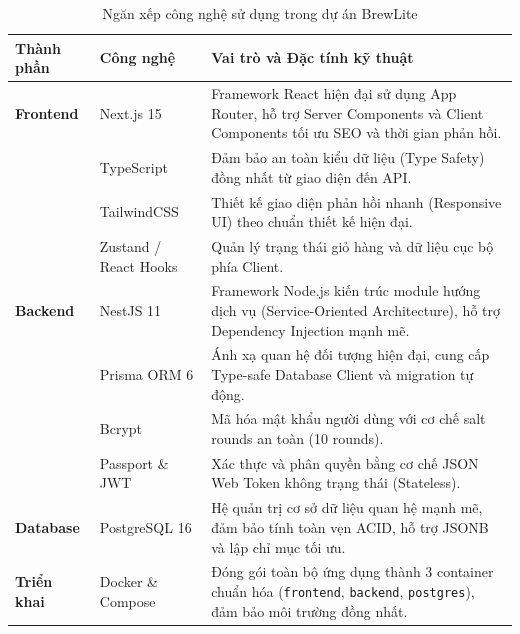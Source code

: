 \begin{table}[htbp]
\centering
\caption{Ngăn xếp công nghệ sử dụng trong dự án BrewLite}
\label{tab:tech-stack}
\begin{tabularx}{\textwidth}{llX}
\toprule
\textbf{Thành phần} & \textbf{Công nghệ} & \textbf{Vai trò và Đặc tính kỹ thuật} \\
\midrule
\textbf{Frontend} & Next.js 15 & Framework React hiện đại sử dụng App Router, hỗ trợ Server Components và Client Components tối ưu SEO và thời gian phản hồi. \\
& TypeScript & Đảm bảo an toàn kiểu dữ liệu (Type Safety) đồng nhất từ giao diện đến API. \\
& TailwindCSS & Thiết kế giao diện phản hồi nhanh (Responsive UI) theo chuẩn thiết kế hiện đại. \\
& Zustand / React Hooks & Quản lý trạng thái giỏ hàng và dữ liệu cục bộ phía Client. \\
\midrule
\textbf{Backend} & NestJS 11 & Framework Node.js kiến trúc module hướng dịch vụ (Service-Oriented Architecture), hỗ trợ Dependency Injection mạnh mẽ. \\
& Prisma ORM 6 & Ánh xạ quan hệ đối tượng hiện đại, cung cấp Type-safe Database Client và migration tự động. \\
& Bcrypt & Mã hóa mật khẩu người dùng với cơ chế salt rounds an toàn (10 rounds). \\
& Passport \& JWT & Xác thực và phân quyền bằng cơ chế JSON Web Token không trạng thái (Stateless). \\
\midrule
\textbf{Database} & PostgreSQL 16 & Hệ quản trị cơ sở dữ liệu quan hệ mạnh mẽ, đảm bảo tính toàn vẹn ACID, hỗ trợ JSONB và lập chỉ mục tối ưu. \\
\midrule
\textbf{Triển khai} & Docker \& Compose & Đóng gói toàn bộ ứng dụng thành 3 container chuẩn hóa (\texttt{frontend}, \texttt{backend}, \texttt{postgres}), đảm bảo môi trường đồng nhất. \\
\bottomrule
\end{tabularx}
\end{table}

